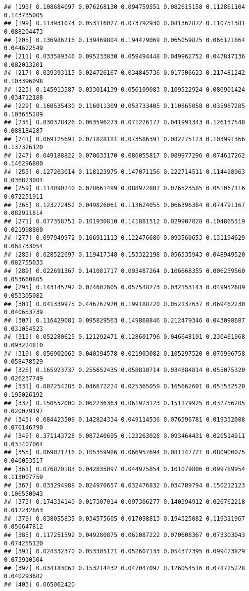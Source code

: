 \documentclass[
]{article}
\begin{document}
\begin{verbatim}
## [193] 0.108684097 0.076268130 0.094759551 0.082615158 0.112861104 0.143735005
## [199] 0.113931074 0.053116027 0.073792930 0.081362872 0.110751381 0.088204473
## [205] 0.136986216 0.139469804 0.194479069 0.065059875 0.066121864 0.044622549
## [211] 0.033589346 0.095233830 0.059494448 0.049962752 0.047847136 0.082013201
## [217] 0.039393115 0.024726167 0.034845736 0.017506623 0.217481242 0.103396098
## [223] 0.145913587 0.033014139 0.056109083 0.109522924 0.080901424 0.034712188
## [229] 0.160535430 0.116011309 0.053733405 0.110865058 0.035967285 0.103655289
## [235] 0.030378426 0.063596273 0.071226177 0.041991343 0.126137548 0.088184287
## [241] 0.069125691 0.071828181 0.073586391 0.082275123 0.103991366 0.137326120
## [247] 0.049188822 0.070633170 0.086055817 0.089977296 0.074617262 0.146296800
## [253] 0.127203014 0.118123975 0.147071156 0.222714511 0.114498963 0.036823004
## [259] 0.114090240 0.078661499 0.088972807 0.076523585 0.051067116 0.072251911
## [265] 0.123272452 0.049826061 0.113624055 0.066396384 0.074791167 0.082911814
## [271] 0.077358751 0.101930810 0.141881512 0.029907028 0.104865319 0.021998800
## [277] 0.097949972 0.106911113 0.122476680 0.093560653 0.131194629 0.068733054
## [283] 0.028522697 0.119417348 0.153322198 0.056535943 0.048949520 0.082755033
## [289] 0.022691367 0.141081717 0.093487264 0.106668355 0.006259560 0.053660805
## [295] 0.143145792 0.074607605 0.057548273 0.032153143 0.049952689 0.053305082
## [301] 0.041339975 0.446767920 0.199188720 0.052137637 0.069462230 0.040653739
## [307] 0.116429081 0.095829563 0.149868846 0.212479346 0.043098687 0.031054523
## [313] 0.052280625 0.121292471 0.128601796 0.046648191 0.230461968 0.093224810
## [319] 0.056902063 0.040394578 0.021903082 0.105297520 0.079996758 0.058478529
## [325] 0.165923737 0.255652435 0.058810714 0.034884814 0.055075320 0.026237749
## [331] 0.007254283 0.046672224 0.025365059 0.165662601 0.051532520 0.195026192
## [337] 0.150552000 0.062236363 0.061923123 0.151179925 0.032756205 0.020079197
## [343] 0.084423509 0.142824334 0.049114536 0.076596781 0.019332088 0.070146790
## [349] 0.371143728 0.087240695 0.123263028 0.093464431 0.020514911 0.031407064
## [355] 0.069071716 0.105359986 0.066957694 0.081147721 0.080900075 0.040053517
## [361] 0.076870183 0.042835097 0.044975854 0.101079806 0.099789954 0.113007759
## [367] 0.033294988 0.024970657 0.032476832 0.034789794 0.150212123 0.106550043
## [373] 0.174334140 0.017307014 0.097306277 0.140394912 0.026762218 0.012242863
## [379] 0.038055835 0.034575605 0.017098813 0.194325082 0.119311967 0.050647812
## [385] 0.117251592 0.049280875 0.061087222 0.070608367 0.073303043 0.074255120
## [391] 0.024332370 0.053305121 0.052607133 0.054377395 0.099423829 0.073910304
## [397] 0.034183061 0.153214432 0.047047097 0.126054516 0.078725228 0.040293682
## [403] 0.065062420
\end{verbatim}
\end{document}

